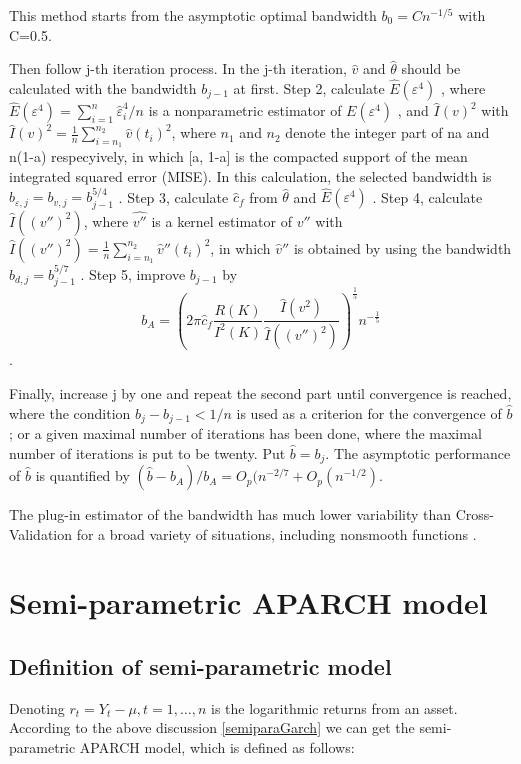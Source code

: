 This method starts from the asymptotic optimal bandwidth $b_{0}= Cn^{-1/5}$ with C=0.5.

Then follow j-th iteration process. In the j-th iteration, $\hat{v}$  and $\hat{\theta}$  should be calculated with the bandwidth $b_{j-1}$  at first. Step 2, calculate $\hat{E}(\varepsilon^{4})$ , where $\hat{E} (\varepsilon^{4}) = \sum_{i=1}^{n}\hat{\varepsilon}_{i}^{4}/n$  is a nonparametric estimator of $E(\varepsilon^{4})$ , and $\hat{I}(v)^{2}$  with   $\hat{I}(v)^{2} = \frac{1}{n}\sum_{i=n_{1}}^{n_{2}}\hat{v}(t_{i})^{2}$, where $n_{1}$  and $n_{2}$ denote the integer part of na and n(1-a) respecyively, in which [a, 1-a] is the compacted support of the mean integrated squared error (MISE). In this calculation, the selected bandwidth is $b_{\varepsilon,j}=b_{v,j}=b_{j-1}^{5/4}$ . Step 3, calculate $\hat{c}_{f}$  from $\hat{\theta}$  and $\hat{E}(\varepsilon^{4})$ . Step 4, calculate $\hat{I}((v'')^{2})$, where $\hat{v''}$  is a kernel estimator of   $v''$  with $\hat{I}((v'')^{2})= \frac{1}{n}\sum_{i=n_{1}}^{n_{2}}\hat{v}''(t_{i})^{2}$, in which $\hat{v}''$ is obtained by using the bandwidth $b_{d,j}=b_{j-1}^{5/7}$ . Step 5, improve $b_{j-1}$  by 
\[ b_{A} =(2\pi \hat{c}_{f} \frac{R(K)}{I^{2}(K)}\frac{\hat{I}(v^{2})}{\hat{I}((v'')^2)})^{\frac{1}{5}}n^{-\frac{1}{5}} \].

Finally, increase j by one and repeat the second part until convergence is reached, where the condition $b_{j} - b_{j-1} <1/n$  is used as a criterion for the convergence of $\hat{b}$ ; or a given maximal number of iterations has been done, where the maximal number of iterations is put to be twenty. Put $\hat{b} = b_{j}$. The asymptotic performance of $\hat{b}$ is quantified by $(\hat{b}-b_{A})/b_{A}=O_{p}(n^{-2/7}+O_{p}(n^{-1/2})$.

The plug-in estimator of the bandwidth has much lower variability than Cross- Validation for a broad variety of situations, including nonsmooth functions \cite{Gasser1991} \citep{Feng2004}.

\section{Semi-parametric APARCH model}
\subsection{Definition of semi-parametric model}

Denoting $r_{t}= Y_t-\mu,t=1, \ldots,n$ is the logarithmic returns from an asset. According to the above discussion \ref{semiparaGarch} we can get the semi-parametric APARCH model, which is defined as follows:

